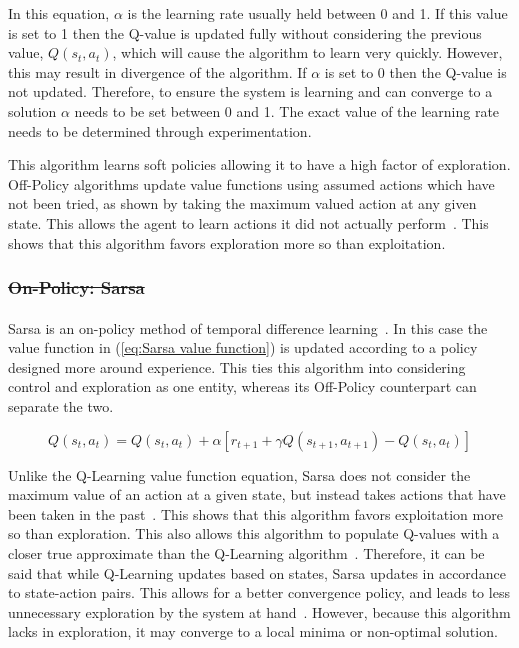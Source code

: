 \documentclass[12pt,american]{report}
\providecommand{\DIFaddtex}[1]{{\protect\color{blue}\uwave{#1}}} %
\providecommand{\DIFdeltex}[1]{{\protect\color{red}\sout{#1}}}                      %
\providecommand{\DIFaddbegin}{} %
\providecommand{\DIFaddend}{} %
\providecommand{\DIFdelbegin}{} %
\providecommand{\DIFdelend}{} %
\providecommand{\DIFadd}[1]{\texorpdfstring{\DIFaddtex{#1}}{#1}} %
\providecommand{\DIFdel}[1]{\texorpdfstring{\DIFdeltex{#1}}{}} %
\newcommand{\DIFscaledelfig}{0.5}
\newlength{\DIFdelgraphicswidth} %
\newlength{\DIFdelgraphicsheight} %
\newcommand{\DIFaddincludegraphics}[2][]{{\color{blue}\fbox{\DIFOincludegraphics[#1]{#2}}}} %
\newcommand{\DIFdelincludegraphics}[2][]{%
\sbox{\DIFdelgraphicsbox}{\DIFOincludegraphics[#1]{#2}}%
\settoboxwidth{\DIFdelgraphicswidth}{\DIFdelgraphicsbox} %
\settoboxtotalheight{\DIFdelgraphicsheight}{\DIFdelgraphicsbox} %
\scalebox{\DIFscaledelfig}{%
\parbox[b]{\DIFdelgraphicswidth}{\usebox{\DIFdelgraphicsbox}\\[-\baselineskip] \rule{\DIFdelgraphicswidth}{0em}}\llap{\resizebox{\DIFdelgraphicswidth}{\DIFdelgraphicsheight}{%
\setlength{\unitlength}{\DIFdelgraphicswidth}%
\begin{picture}(1,1)%
\thicklines\linethickness{2pt} %
{\color[rgb]{1,0,0}\put(0,0){\framebox(1,1){}}}%
{\color[rgb]{1,0,0}\put(0,0){\line( 1,1){1}}}%
{\color[rgb]{1,0,0}\put(0,1){\line(1,-1){1}}}%
\end{picture}%
}\hspace*{3pt}}} %
} %
\DeclareRobustCommand{\DIFaddbegin}{\DIFOaddbegin \let\includegraphics\DIFaddincludegraphics} %
\DeclareRobustCommand{\DIFaddend}{\DIFOaddend \let\includegraphics\DIFOincludegraphics} %
\DeclareRobustCommand{\DIFdelbegin}{\DIFOdelbegin \let\includegraphics\DIFdelincludegraphics} %
\DeclareRobustCommand{\DIFdelend}{\DIFOaddend \let\includegraphics\DIFOincludegraphics} %
\begin{document}
        In this equation, \textit{$\alpha$} is the learning rate usually held between 0 and 1.  If this value is set to 1 then the Q-value is updated fully without considering the previous value, \textit{$Q(s_t,a_t)$}, which will cause the algorithm to learn very quickly. However, this may result in divergence of the algorithm.  If \textit{$\alpha$} is set to 0 then the Q-value is not updated.  Therefore, to ensure the system is learning and can converge to a solution \textit{$\alpha$} needs to be set between 0 and 1. The exact value of the learning rate needs to be determined through experimentation.

        This algorithm learns soft policies allowing it to have a high factor of exploration. Off-Policy algorithms update value functions using assumed actions which have not been tried, as shown by taking the maximum valued action at any given state.  This allows the agent to learn actions it did not actually perform~\cite{Eden}. This shows that this algorithm favors exploration more so than exploitation.  

        \DIFdelbegin \subsubsection{\DIFdel{On-Policy: Sarsa}}
\addtocounter{subsubsection}{-1}%
\DIFdelend \DIFaddbegin \paragraph{\DIFadd{On-Policy: Sarsa}}
        \DIFaddend Sarsa is an on-policy method of temporal difference learning~\cite{sprague2003multiple}. In this case the value function in (\ref{eq:Sarsa value function}) is updated according to a policy designed more around experience.  This ties this algorithm into considering control and exploration as one entity, whereas its Off-Policy counterpart can separate the two.

        \begin{equation}
            \label{eq:Sarsa value function}
            Q(s_{t},a_{t}) = Q(s_{t},a_{t}) + \alpha[r_{t+1} + \gamma Q(s_{t+1},a_{t+1})-Q(s_{t},a_{t})]
        \end{equation}

        Unlike the Q-Learning value function equation, Sarsa does not consider the maximum value of an action at a given state, but instead takes actions that have been taken in the past~\cite{Eden}. This shows that this algorithm favors exploitation more so than exploration. This also allows this algorithm to populate Q-values with a closer true approximate than the Q-Learning algorithm~\cite{sprague2003multiple}. Therefore, it can be said that while Q-Learning updates based on states, Sarsa updates in accordance to state-action pairs.  This allows for a better convergence policy, and leads to less unnecessary exploration by the system at hand~\cite{sutton1996generalization}.  However, because this algorithm lacks in exploration, it may converge to a local minima or non-optimal solution.
\end{document}
